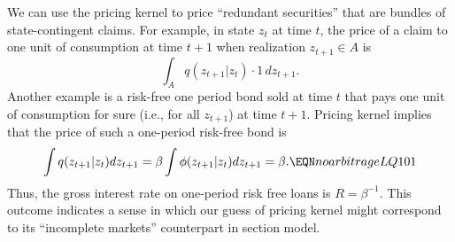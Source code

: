 We can use  the pricing kernel to  price ``redundant securities'' that are  bundles of 
state-contingent claims. 
For example, in state $z_t $  at time $t$, the price  of a
claim to one unit of  consumption
at time $t+1$ when realization $z_{t+1} \in A$
is 
$$
\int_A  q(z_{t+1} | z_t ) \cdot 1 \, d  z_{t+1} .
$$ 
 Another example is a risk-free one period bond sold at time $t$ that  pays one unit of consumption for sure
  (i.e.,  for all $z_{t+1}$) at time $t+1$. %
Pricing kernel 
implies that the price of  such a   one-period risk-free bond is
$$ \int q(z_{t+1} | z_t) d z_{t+1} = \beta \int \phi(z_{t+1} | z_t) d z_{t+1} = \beta.  \EQN noarbitrageLQ101 $$
Thus,   the gross interest rate on one-period risk free loans is  $R=\beta^{-1}$. This outcome indicates a sense in which our guess of pricing kernel  might 
correspond to its ``incomplete markets'' counterpart  in section  model. 


